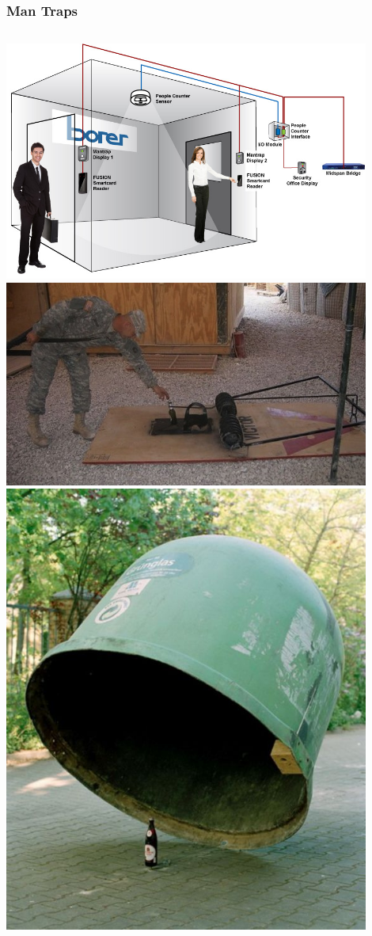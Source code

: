 \documentclass[]{beamer}
\begin{document}
\begin{frame}
  \frametitle{Man Traps}
  \begin{columns}
    \includegraphics[width=0.9\textwidth]{access-control-mantrap}
    \includegraphics[width=0.9\textwidth]{Man-Trap-1}
    \vspace{1.5mm}
    \includegraphics[width=0.9\textwidth]{Man-Trap-2}
  \end{columns}
\end{frame}
\end{document}

